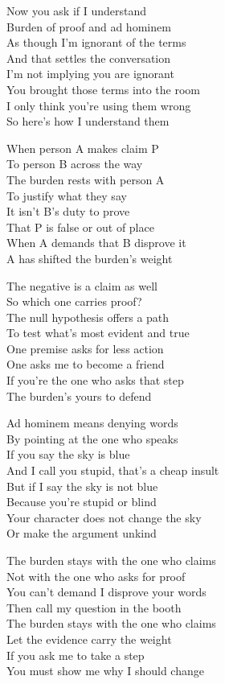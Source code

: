 \begin{lyrics}
Now you ask if I understand\\
Burden of proof and ad hominem\\
As though I'm ignorant of the terms\\
And that settles the conversation\\
I'm not implying you are ignorant\\
You brought those terms into the room\\
I only think you're using them wrong\\
So here's how I understand them

When person A makes claim P\\
To person B across the way\\
The burden rests with person A\\
To justify what they say\\
It isn't B's duty to prove\\
That P is false or out of place\\
When A demands that B disprove it\\
A has shifted the burden's weight

The negative is a claim as well\\
So which one carries proof?\\
The null hypothesis offers a path\\
To test what's most evident and true\\
One premise asks for less action\\
One asks me to become a friend\\
If you're the one who asks that step\\
The burden's yours to defend

Ad hominem means denying words\\
By pointing at the one who speaks\\
If you say the sky is blue\\
And I call you stupid, that's a cheap insult\\
But if I say the sky is not blue\\
Because you're stupid or blind\\
Your character does not change the sky\\
Or make the argument unkind

The burden stays with the one who claims\\
Not with the one who asks for proof\\
You can't demand I disprove your words\\
Then call my question in the booth\\
The burden stays with the one who claims\\
Let the evidence carry the weight\\
If you ask me to take a step\\
You must show me why I should change


\end{lyrics}
